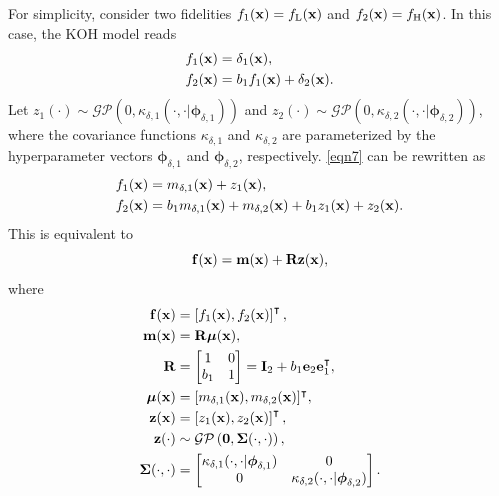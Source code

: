 \documentclass[journal ]{new-aiaa}
\begin{document}
For simplicity, consider two fidelities $f_{1}({\bf x})=f_\text{L}({\bf x})$ and $f_{2}({\bf x})=f_\text{H}({\bf x})$.
In this case, the KOH model reads
\begin{subequations}\label{eqn7}
	\begin{align}
		f_1({\bf x}) & = \delta_1({\bf x}) 
		\label{eqn7-1},\\
		f_2({\bf x}) & = b_{1} f_{1}({\bf x}) + \delta_2({\bf x})
		\label{eqn7-2}.
	\end{align}
\end{subequations}
Let $z_1({\cdot}) \sim \mathcal{GP}\left(0,\kappa_{\delta,1}(\cdot,\cdot|{\boldsymbol \phi}_{\delta,1})\right)$ and $z_2({\cdot}) \sim \mathcal{GP}\left(0,\kappa_{\delta,2}(\cdot,\cdot|{\boldsymbol \phi}_{\delta,2})\right)$, where the covariance functions $\kappa_{\delta,1}$ and $\kappa_{\delta,2}$ are parameterized by the hyperparameter vectors ${\boldsymbol \phi}_{\delta,1}$ and ${\boldsymbol \phi}_{\delta,2}$, respectively.
\cref{eqn7} can be rewritten as
\begin{subequations}\label{eqn8}
	\begin{align}
		f_1({\bf x}) & = m_{\delta,1}({\bf x}) + z_1({\bf x}) 
		\label{eqn8-1},\\
		f_2({\bf x}) & = b_1  m_{\delta,1}({\bf x}) + m_{\delta,2}({\bf x}) + b_1 z_1({\bf x}) + z_2({\bf x})
		\label{eqn8-2}.
	\end{align}
\end{subequations}
This is equivalent to
\begin{equation}\label{eqn9}
	{\bf f}({\bf x}) =  {\bf m}({\bf x}) + {\bf R} {\bf z}({\bf x}),
\end{equation}
where
\begin{subequations}\label{eqn10}
	\begin{align}
		{\bf f}({\bf x}) &= \left[f_1({\bf x}),f_2({\bf x})\right]^\intercal 
		\label{eqn10-1},\\
		{\bf m}({\bf x}) &= {\bf R} \boldsymbol{\mu}({\bf x}), \label{eqn10-2}\\
		{\bf R} &= \left[\begin{matrix}
			1 & 0 \\
			b_1 & 1
		\end{matrix}\right] = {\bf I}_2 + b_1 {\bf e}_2 {\bf e}^\intercal_1, \label{eqn10-3}\\
		\boldsymbol{\mu}({\bf x}) & = [m_{\delta,1}({\bf x}),m_{\delta,2}({\bf x})]^\intercal,
		\label{eqn10-4}\\
		{\bf z}({\bf x}) & = \left[z_1({\bf x}),z_2({\bf x})\right]^\intercal, \label{eqn10-5}\\
		{\bf z}(\cdot) & \sim \mathcal{GP}\left({\bf 0},{\boldsymbol \Sigma}(\cdot,\cdot)\right),
		\label{eqn10-6}\\
		{\boldsymbol \Sigma}(\cdot,\cdot) & = \left[\begin{matrix}
			\kappa_{\delta,1}(\cdot,\cdot|{\boldsymbol \phi}_{\delta,1}) & 0 \\
			0 & \kappa_{\delta,2}(\cdot,\cdot|{\boldsymbol \phi}_{\delta,2})
		\end{matrix}\right] \label{eqn10-7}.
	\end{align}
\end{subequations}
\end{document}

